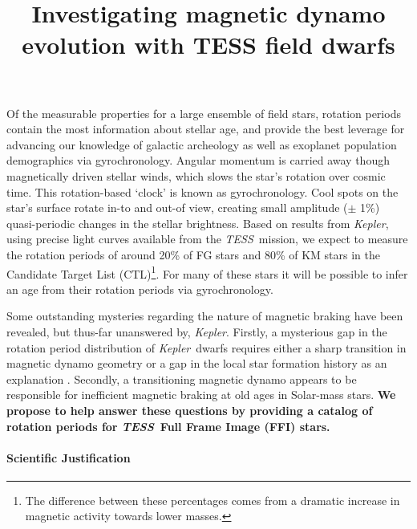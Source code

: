 \documentclass[letterpaper,12pt,preprint]{hack_aastex}
\newcommand{\Kepler}{{\it Kepler}}
\newcommand{\kepler}{\Kepler}
\newcommand{\TESS}{{\it TESS}}
\begin{document}
\title{Investigating magnetic dynamo evolution with TESS field dwarfs}

Of the measurable properties for a large ensemble of field stars, rotation
periods contain the most information about stellar age, and provide the best
leverage for advancing our knowledge of galactic archeology as well as
exoplanet population demographics via gyrochronology.
Angular momentum is carried away though magnetically driven stellar winds,
which slows the star's rotation over cosmic time.
This rotation-based `clock' is known as gyrochronology.
Cool spots on the star's surface rotate in-to and out-of view, creating small
amplitude ($\pm$ 1\%) quasi-periodic changes in the stellar brightness.
Based on results from \Kepler, using precise light curves available from the
\TESS\ mission, we expect to measure the rotation periods of around 20\% of FG
stars and 80\% of KM stars in the Candidate Target List (CTL)\footnote{The
difference between these percentages comes from a dramatic increase in
magnetic activity towards lower masses.}.
For many of these stars it will be possible to infer an age from their
rotation periods via gyrochronology.

Some outstanding mysteries regarding the nature of magnetic braking have been
revealed, but thus-far unanswered by, \kepler.
Firstly, a mysterious gap in the rotation period distribution of \Kepler\
dwarfs requires either a sharp transition in magnetic dynamo geometry or a gap
in the local star formation history as an explanation \citep{mcquillan2014,
davenport2017}.
Secondly, a transitioning magnetic dynamo appears to be responsible for
inefficient magnetic braking at old ages in Solar-mass stars.
{\bf We propose to help answer these questions by providing a catalog of
rotation periods for \TESS\ Full Frame Image (FFI) stars.}

\paragraph{Scientific Justification}
\end{document}
